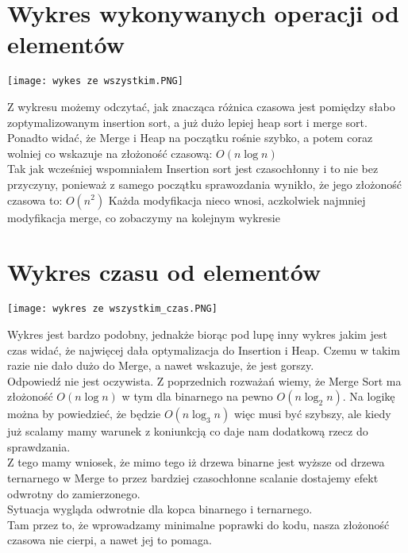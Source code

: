 \documentclass[12pt,a4paper]{article}
\begin{document}
\section{Wykres wykonywanych operacji od elementów}
\begin{center}
    \texttt{[image: wykes ze wszystkim.PNG]}
\end{center}

Z wykresu możemy odczytać, jak znacząca różnica czasowa jest pomiędzy słabo zoptymalizowanym insertion sort, a już dużo lepiej heap sort i merge sort.\\
Ponadto widać, że Merge i Heap na początku rośnie szybko, a potem coraz wolniej co wskazuje na złożoność czasową: $O(n \log n)$\\
Tak jak wcześniej wspomniałem Insertion sort jest czasochłonny i to nie bez przyczyny, ponieważ z samego początku sprawozdania wynikło, że jego złożoność czasowa to: $O(n^2)$
Każda modyfikacja nieco wnosi, aczkolwiek najmniej modyfikacja merge, co zobaczymy na kolejnym wykresie
\clearpage
\section{Wykres czasu od elementów}
\begin{center}
    \texttt{[image: wykres ze wszystkim\_czas.PNG]}
\end{center}
Wykres jest bardzo podobny, jednakże biorąc pod lupę inny wykres jakim jest czas widać, że najwięcej dała optymalizacja do Insertion i Heap. Czemu w takim razie nie dało dużo do Merge, a nawet wskazuje, że jest gorszy.\\
Odpowiedź nie jest oczywista. Z poprzednich rozważań wiemy, że Merge Sort ma złożoność $O(n \log n)$ w tym dla binarnego na pewno $O(n \log_2{n})$. Na logikę można by powiedzieć, że będzie $O(n \log_3{n})$ więc musi być szybszy, ale kiedy już scalamy mamy warunek z koniunkcją co daje nam dodatkową rzecz do sprawdzania.\\
Z tego mamy wniosek, że mimo tego iż drzewa binarne jest wyższe od drzewa ternarnego w Merge to przez bardziej czasochłonne scalanie dostajemy efekt odwrotny do zamierzonego.\\
Sytuacja wygląda odwrotnie dla kopca binarnego i ternarnego.\\
Tam przez to, że wprowadzamy minimalne poprawki do kodu, nasza złożoność czasowa nie cierpi, a nawet jej to pomaga.
\clearpage
\end{document}

